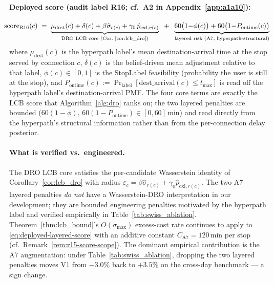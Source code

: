 \documentclass[11pt]{article}
\theoremstyle{definition}
\theoremstyle{remark}
\begin{document}
\paragraph{Deployed score (audit label R16; cf.\ A2 in Appendix~\ref{app:a1a10}):}
\begin{equation}
\label{eq:deployed-layered-score}
\!\!\!\!\!
\mathrm{score}_{\mathrm{R16}}(c)
\;=\;
\underbrace{\mu_{\mathrm{dest}}(c) + \delta(c)
  + \beta\hat\sigma_{r(c)}
  + \gamma_0\,\hat p_{\mathrm{cxl},r(c)}}_{\text{DRO LCB core (Cor.~\ref{cor:lcb_dro})}}
\;\;+\;\;
\underbrace{60\bigl(1{-}\phi(c)\bigr) + 60\bigl(1{-}P_{\mathrm{ontime}}(c)\bigr)}_{\text{layered risk (A7, hyperpath-structural)}}
\!\!\!
\end{equation}
where $\mu_{\mathrm{dest}}(c)$ is the hyperpath label's mean
destination-arrival time at the stop served by connection $c$,
$\delta(c)$ is the belief-driven mean adjustment relative to that
label, $\phi(c)\in[0,1]$ is the StopLabel feasibility (probability
the user is still at the stop), and $P_{\mathrm{ontime}}(c) :=
\Pr_{\mathrm{label}}[\mathrm{dest\_arrival}(c) \leq t_{\max}]$ is
read off the hyperpath label's destination-arrival PMF. The four
core terms are exactly the LCB score that Algorithm~\ref{alg:dro}
ranks on; the two layered penalties are bounded
($60(1-\phi),\,60(1-P_{\mathrm{ontime}}) \in [0,60]$\,min) and read
directly from the hyperpath's structural information rather than
from the per-connection delay posterior.

\paragraph{What is verified vs.\ engineered.} The DRO LCB core
satisfies the per-candidate Wasserstein identity of
Corollary~\ref{cor:lcb_dro} with radius $\varepsilon_c =
\beta\hat\sigma_{r(c)} + \gamma_0\hat p_{\mathrm{cxl},r(c)}$. The
two A7 layered penalties \emph{do not} have a Wasserstein-DRO
interpretation in our development; they are bounded engineering
penalties motivated by the hyperpath label and verified empirically
in Table~\ref{tab:swiss_ablation}. Theorem~\ref{thm:lcb_bound}'s
$O(\sigma_{\max})$ excess-cost rate continues to apply to
\eqref{eq:deployed-layered-score} with an additive constant $C_{\mathrm{A7}}=120$\,min
per stop (cf.\ Remark~\ref{rem:r15-score-scope}). The dominant
empirical contribution is the A7 augmentation: under
Table~\ref{tab:swiss_ablation}, dropping the two layered penalties
moves V1 from $-3.0\%$ back to $+3.5\%$ on the cross-day benchmark
--- a sign change.
\end{document}
